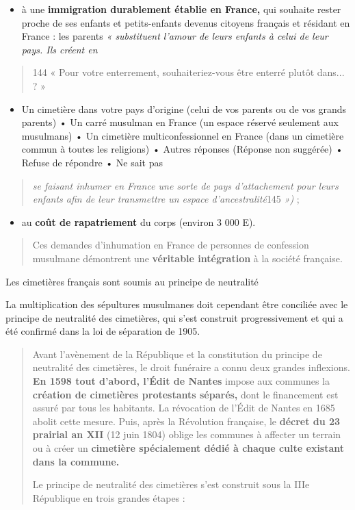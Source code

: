 \begin{itemize}
\item
  à une \textbf{immigration durablement établie en France,} qui souhaite
  rester proche de ses enfants et petits-enfants devenus citoyens
  français et résidant en France : les parents \emph{« substituent
  l'amour de leurs enfants à celui de leur pays. Ils créent en}
\end{itemize}

\begin{quote}
144 « Pour votre enterrement, souhaiteriez-vous être enterré plutôt
dans... ? »
\end{quote}

\begin{itemize}
\item
  Un cimetière dans votre pays d'origine (celui de vos parents ou de vos
  grands parents) • Un carré musulman en France (un espace réservé
  seulement aux musulmans) • Un cimetière multiconfessionnel en France
  (dans un cimetière commun à toutes les religions) • Autres réponses
  (Réponse non suggérée) • Refuse de répondre • Ne sait pas
\end{itemize}

\begin{quote}


\emph{se faisant inhumer en France une sorte de pays d'attachement pour
leurs enfants afin de leur transmettre un espace d'ancestralité}145
\emph{»)} ;
\end{quote}

\begin{itemize}
\item
  au \textbf{coût de rapatriement} du corps (environ 3 000 E).
\end{itemize}

\begin{quote}
Ces demandes d'inhumation en France de personnes de confession musulmane
démontrent une \textbf{véritable intégration} à la société française.
\end{quote}

Les cimetières français sont soumis au principe de neutralité

La multiplication des sépultures musulmanes doit cependant être
conciliée avec le principe de neutralité des cimetières, qui s'est
construit progressivement et qui a été confirmé dans la loi de
séparation de 1905.

\begin{quote}
Avant l'avènement de la République et la constitution du principe de
neutralité des cimetières, le droit funéraire a connu deux grandes
inflexions. \textbf{En 1598 tout d'abord, l'Édit de Nantes} impose aux
communes la \textbf{création de cimetières protestants séparés,} dont le
financement est assuré par tous les habitants. La révocation de l'Édit
de Nantes en 1685 abolit cette mesure. Puis, après la Révolution
française, le \textbf{décret du 23 prairial an XII} (12 juin 1804)
oblige les communes à affecter un terrain ou à créer un
\textbf{cimetière spécialement dédié à chaque culte existant dans la
commune.}

Le principe de neutralité des cimetières s'est construit sous la IIIe
République en trois grandes étapes :
\end{quote}

